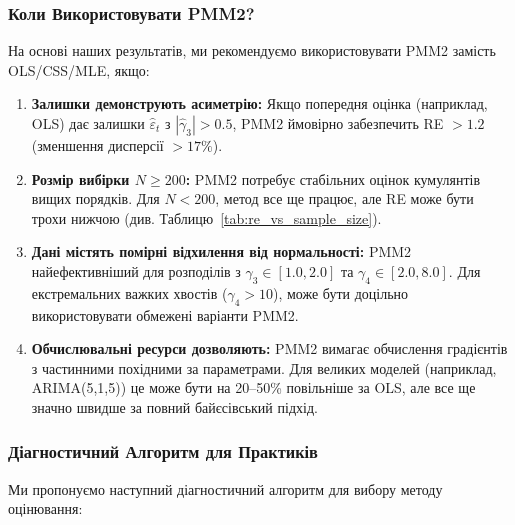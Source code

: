\documentclass[12pt,a4paper]{article}
\begin{document}
\subsubsection{Коли Використовувати PMM2?}

На основі наших результатів, ми рекомендуємо використовувати PMM2 замість OLS/CSS/MLE, якщо:

\begin{enumerate}
    \item \textbf{Залишки демонструють асиметрію:} Якщо попередня оцінка (наприклад, OLS) дає залишки $\hat{\varepsilon}_t$ з $|\hat{\gamma}_3| > 0.5$, PMM2 ймовірно забезпечить RE $> 1.2$ (зменшення дисперсії $> 17\%$).

    \item \textbf{Розмір вибірки $N \geq 200$:} PMM2 потребує стабільних оцінок кумулянтів вищих порядків. Для $N < 200$, метод все ще працює, але RE може бути трохи нижчою (див. Таблицю~\ref{tab:re_vs_sample_size}).

    \item \textbf{Дані містять помірні відхилення від нормальності:} PMM2 найефективніший для розподілів з $\gamma_3 \in [1.0, 2.0]$ та $\gamma_4 \in [2.0, 8.0]$. Для екстремальних важких хвостів ($\gamma_4 > 10$), може бути доцільно використовувати обмежені варіанти PMM2.

    \item \textbf{Обчислювальні ресурси дозволяють:} PMM2 вимагає обчислення градієнтів з частинними похідними за параметрами. Для великих моделей (наприклад, ARIMA(5,1,5)) це може бути на 20--50\% повільніше за OLS, але все ще значно швидше за повний байєсівський підхід.
\end{enumerate}

\subsubsection{Діагностичний Алгоритм для Практиків}

Ми пропонуємо наступний діагностичний алгоритм для вибору методу оцінювання:
\end{document}
